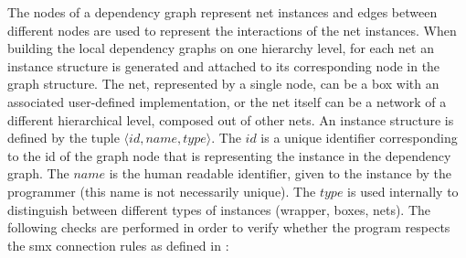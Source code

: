 The nodes of a dependency graph represent net instances and edges between different nodes are used to represent the interactions of the net instances.
When building the local dependency graphs on one hierarchy level, for each net an instance structure is generated and attached to its corresponding node in the graph structure.
The net, represented by a single node, can be a box with an associated user-defined implementation, or the net itself can be a network of a different hierarchical level, composed out of other nets.
An instance structure is defined by the tuple $\langle id, name, type \rangle$.
The $id$ is a unique identifier corresponding to the id of the graph node that is representing the instance in the dependency graph.
The $name$ is the human readable identifier, given to the instance by the programmer (this name is not necessarily unique).
The $type$ is used internally to distinguish between different types of instances (\eg wrapper, boxes, nets).
The following checks are performed in order to verify whether the program respects the \gls*{smx} connection rules as defined in \Sect{\ref{sect_smx_network}}:
